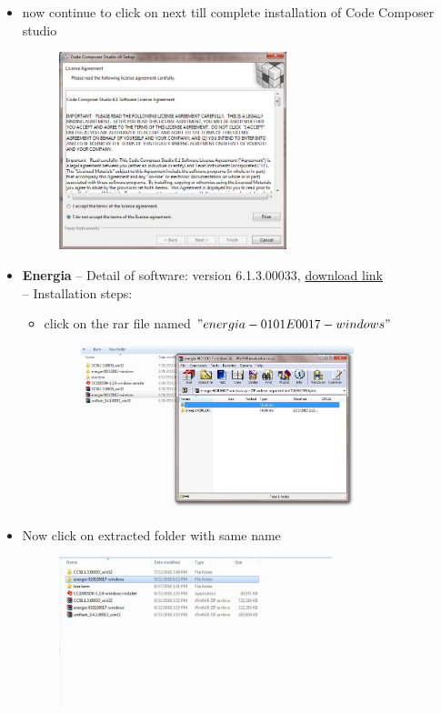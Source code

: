 \documentclass[a4paper,12pt,oneside]{book}
\begin{document}
\begin{enumerate}
\begin{itemize}
\begin{figure}[h]
  	 \end{figure}
  	 \item now continue to click on next till complete installation of Code Composer studio
  	 \begin{figure}[h]
  	 		\hspace{2cm}
  	 	\includegraphics[width=250px]{inst4}
  	  \end{figure} 
  	  \newpage
  	  \item \textbf{Energia}
  	   -- Detail of software: version 6.1.3.00033, \href{http://www.energia.nu}{download link}\\
  	   -- Installation steps:
  	   \begin{itemize}
  	   	\item click on the rar file named $"energia-0101E0017-windows"$
  	   	\begin{figure}[h]
  	   		\hspace{2cm}
  	   		\includegraphics[width=300px]{inst5}
  	   	\end{figure}
  	   \end{itemize}
  	   \item Now click on extracted folder with same name
  	   \begin{figure}[h]
  	   	\hspace{2cm}
  	   	\includegraphics[width=300px]{inst6}

\end{figure}
\end{itemize}
\end{enumerate}
\end{document}
